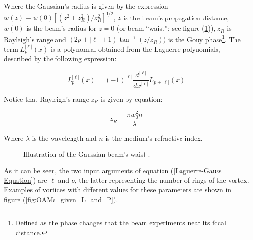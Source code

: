 Where the Gaussian's radius is given by the expression $w(z) = w(0)[(z^2+z^2_R)/z^2_R]^{1/2}$, $z$ is the beam's propagation distance, $w(0)$ is the beam's radius for $z=0$ (or beam ``waist''; see figure (\ref{fig:Gaussian_Beam_Waist})), $z_R$ is Rayleigh's range and $(2p+|\ell|+1)\tan^{-1}{(z/z_R)})$ is the Gouy phase\footnote{Defined as the phase changes that the beam experiments near its focal distance.}. The term $L_p^{|\ell|}(x)$ is a polynomial obtained from the Laguerre polynomials, described by the following expression:

\begin{equation}
    L_p^{|\ell|}(x) = (-1)^{|\ell|}\frac{d^{|\ell|}}{dx^{|\ell|}}L_{p+|\ell|}(x)
\end{equation}

Notice that Rayleigh's range $z_R$ is given by equation:

\begin{equation}
    z_R = \frac{\pi w_0^2n}{\lambda}
\end{equation}

Where $\lambda$ is the wavelength and $n$ is the medium's refractive index.

\begin{figure}[htbp]
    \centering
    \caption{Illustration of the Gaussian beam's waist \protect\cite{GaussianBeamParameters}.}
    \label{fig:Gaussian_Beam_Waist}
\end{figure}

As it can be seen, the two input arguments of equation (\ref{Laguerre-Gauss Equation}) are $\ell$ and $p$, the latter representing the number of rings of the vortex. Examples of vortices with different values for these parameters are shown in figure (\ref{fig:OAMs_given_L_and_P}).

